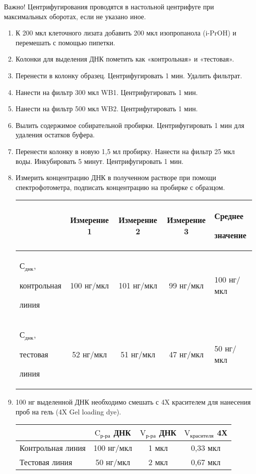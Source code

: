 Важно! Центрифугирования проводятся в настольной центрифуге при максимальных оборотах, если не указано иное.
\begin{enumerate}
\item К 200 мкл клеточного лизата добавить 200 мкл изопропанола (i-PrOH) и перемешать с помощью пипетки.
\item Колонки для выделения ДНК пометить как «контрольная» и «тестовая».
\item Перенести в колонку образец. Центрифугировать 1 мин. Удалить фильтрат.
\item Нанести на фильтр 300 мкл WB1. Центрифугировать 1 мин.
\item Нанести на фильтр 500 мкл WB2. Центрифугировать 1 мин.
\item Вылить содержимое собирательной пробирки. Центрифугировать 1 мин для удаления остатков буфера.
\item Перенести колонку в новую 1,5 мл пробирку. Нанести на фильтр 25 мкл воды. Инкубировать 5 минут. Центрифугировать 1 мин.
\item Измерить концентрацию ДНК в полученном растворе при помощи спектрофотометра, подписать концентрацию на пробирке с образцом.

\begin{tabular}{|p{2.5cm}|c|c|c|p{2.5cm}|}
    \hline
    & Измерение 1 & Измерение 2 & Измерение 3 & Среднее 
    
    значение \\
    \hline
    $\text{С}_\text{днк}$, 
    
    контрольная 
    
    линия & 100 нг/мкл & 101 нг/мкл & 99 нг/мкл & 100 нг/мкл \\
    \hline
    $\text{С}_\text{днк}$, 
    
    тестовая 
    
    линия & 52 нг/мкл & 51 нг/мкл & 47 нг/мкл & 50 нг/мкл \\
    \hline
\end{tabular}

\item 100 нг выделенной ДНК необходимо смешать с 4X красителем для нанесения проб на гель (4X Gel loading dye).

\begin{tabular}{|l|c|c|c|}
    \hline
    & $\text{C}_\text{р-ра}$ ДНК & $\text{V}_\text{р-ра}$ ДНК & $\text{V}_\text{красителя}$ 4Х \\
    \hline
    Контрольная линия & 100 нг/мкл & 1 мкл & 0,33 мкл \\
    \hline
    Тестовая линия & 50 нг/мкл & 2 мкл & 0,67 мкл \\
    \hline
\end{tabular}


\end{enumerate}
